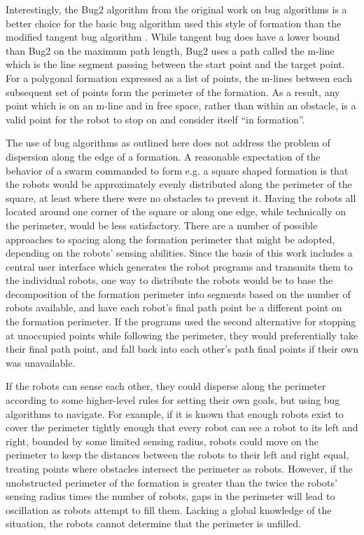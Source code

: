 Interestingly, the Bug2 algorithm from the original work on bug algorithms is a better choice for the basic bug algorithm used this style of formation than the modified tangent bug algorithm \citep{lumelsky1987path}. 
While tangent bug does have a lower bound than Bug2 on the maximum path length, Bug2 uses a path called the m-line which is the line segment passing between the start point and the target point.
For a polygonal formation expressed as a list of points, the m-lines between each subsequent set of points form the perimeter of the formation. 
As a result, any point which is on an m-line and in free space, rather than within an obstacle, is a valid point for the robot to stop on and consider itself ``in formation''. 

The use of bug algorithms as outlined here does not address the problem of dispersion along the edge of a formation. 
A reasonable expectation of the behavior of a swarm commanded to form e.g. a square shaped formation is that the robots would be approximately evenly distributed along the perimeter of the square, at least where there were no obstacles to prevent it. 
Having the robots all located around one corner of the square or along one edge, while technically on the perimeter, would be less satisfactory. 
There are a number of possible approaches to spacing along the formation perimeter that might be adopted, depending on the robots' sensing abilities.
Since the basis of this work includes a central user interface which generates the robot programs and transmits them to the individual robots, one way to distribute the robots would be to base the decomposition of the formation perimeter into segments based on the number of robots available, and have each robot's final path point be a different point on the formation perimeter. 
If the programs used the second alternative for stopping at unoccupied points while following the perimeter, they would preferentially take their final path point, and fall back into each other's path final points if their own was unavailable.

If the robots can sense each other, they could disperse along the perimeter according to some higher-level rules for setting their own goals, but using bug algorithms to navigate. 
For example, if it is known that enough robots exist to cover the perimeter tightly enough that every robot can see a robot to its left and right, bounded by some limited sensing radius, robots could move on the perimeter to keep the distances between the robots to their left and right equal, treating points where obstacles intersect the perimeter as robots.
However, if the unobstructed perimeter of the formation is greater than the twice the robots' sensing radius times the number of robots, gaps in the perimeter will lead to oscillation as robots attempt to fill them. 
Lacking a global knowledge of the situation, the robots cannot determine that the perimeter is unfilled. 

